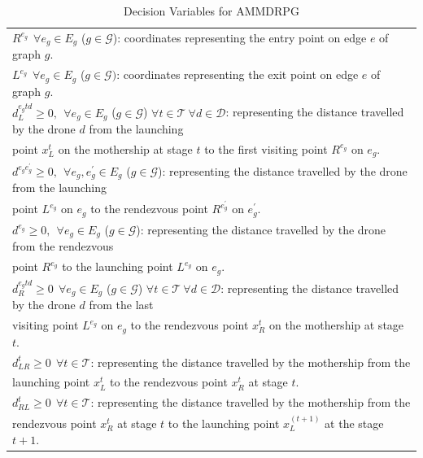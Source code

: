 \begin{table}[h!]
\begin{tabular}{|l|}
$R^{e_g} \:\: \forall e_g \in E_g$ ($g \in \mathcal{G}$): coordinates representing the entry point on edge $e$ of graph $g$.\\
$L^{e_g} \:\: \forall e_g \in E_g$ ($g \in \mathcal{G})$: coordinates representing the exit point on edge $e$ of graph $g$.\\
$d_L^{e_gtd} \geq 0, \:\: \forall e_g \in E_g$ ($g \in \mathcal{G}$) $\forall t \in\mathcal T \:\forall d\in\mathcal D$: representing the distance travelled by the drone $d$ from the launching\\
\hspace*{1cm} point $x_L^t$ on the mothership at stage $t$ to the first visiting point $R^{e_g}$ on $e_g$.\\
$d^{e_ge^\prime_g} \geq 0, \:\: \forall e_g, e^\prime_g \in E_g $ ($g \in \mathcal{G}$): representing the distance travelled by the drone from the launching\\
\hspace*{1cm} point $L^{e_g}$ on $e_g$ to the rendezvous point $R^{e^\prime_g}$ on $e^\prime_g$.\\
$d^{e_g} \geq 0, \:\: \forall e_g \in E_g$ ($g \in \mathcal{G}$): representing the distance travelled by the drone from the rendezvous\\
\hspace*{1cm} point $R^{e_g}$ to the launching point $L^{e_g}$ on $e_g$. \\
$d_R^{e_gtd} \geq 0 \:\: \forall e_g \in E_g$ ($g \in \mathcal{G}$) $\forall t \in\mathcal T\:\forall d\in\mathcal D$: representing the distance travelled by the drone $d$ from the last\\
\hspace*{1cm} visiting point $L^{e_g}$ on $e_g$ to the rendezvous point $x_R^t$ on the mothership at stage $t$.\\
$d_{LR}^t \geq 0 \:\: \forall t \in\mathcal T$: representing the distance travelled by the mothership from the \\
\hspace*{1cm} launching point $x_L^t$ to the rendezvous point $x_R^t$ at stage $t$.\\
$d_{RL}^t \geq 0 \:\: \forall t \in\mathcal T$: representing the distance travelled by the mothership from the \\ 
\hspace*{1cm} rendezvous point $x_R^t$ at stage $t$ to the launching point $x_L^{(t+1)}$ at the stage $t+1$.\\
\hline
\end{tabular}
\caption{Decision Variables for AMMDRPG}
\label{table:t2}
\end{table}

